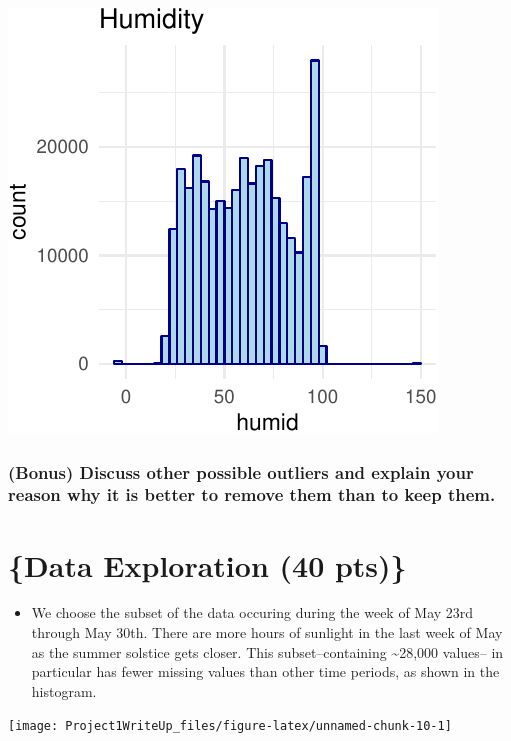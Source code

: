 \documentclass[]{article}
\providecommand{\tightlist}{%
  \setlength{\itemsep}{0pt}\setlength{\parskip}{0pt}}
\begin{document}
\begin{center}\includegraphics{Project1WriteUp_files/figure-latex/unnamed-chunk-9-3} \end{center}

\subsubsection{(Bonus) Discuss other possible outliers and explain your
reason why it is better to remove them than to keep
them.}\label{bonus-discuss-other-possible-outliers-and-explain-your-reason-why-it-is-better-to-remove-them-than-to-keep-them.}

\section{\{Data Exploration (40 pts)\}}\label{data-exploration-40-pts}

\begin{itemize}
\tightlist
\item
  We choose the subset of the data occuring during the week of May 23rd
  through May 30th. There are more hours of sunlight in the last week of
  May as the summer solstice gets closer. This subset--containing
  \textasciitilde{}28,000 values-- in particular has fewer missing
  values than other time periods, as shown in the histogram.
\end{itemize}

\begin{center}\texttt{[image: Project1WriteUp\_files/figure-latex/unnamed-chunk-10-1]} \end{center}
\end{document}
